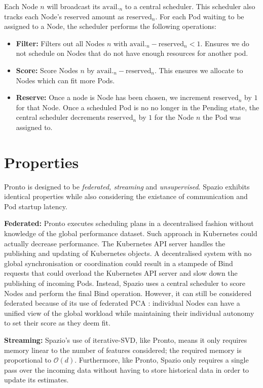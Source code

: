 Each Node $n$ will broadcast its $\text{avail.}_n$ to a central scheduler. This
scheduler also tracks each Node's reserved amount as $\text{reserved}_n$. For
each Pod waiting to be assigned to a Node, the scheduler performs the following
operations:
\begin{itemize}
    \item \textbf{Filter:} Filters out all Nodes $n$ with $\text{avail.}_n -
        \text{reserved}_n < 1$. Ensures we do not schedule on Nodes that do not
        have enough resources for another pod.
    \item \textbf{Score:} Score Nodes $n$ by $\text{avail.}_n -
        \text{reserved}_n$. This ensures we allocate to Nodes which can fit more
        Pods.
    \item \textbf{Reserve:} Once a node is Node has been chosen, we increment
        $\text{reserved}_n$ by $1$ for that Node. Once a scheduled Pod is no
        no longer in the Pending state, the central scheduler decrements
        $\text{reserved}_n$ by $1$ for the Node $n$ the Pod was assigned to.
\end{itemize}

\section{Properties}
Pronto is designed to be \textit{federated, streaming} and
\textit{unsupervised}. Spazio exhibits identical properties while also
considering the existance of communication and Pod startup latency.

\textbf{Federated:} Pronto executes scheduling plans in a decentralised fashion
without knowledge of the global performance dataset. Such approach in
Kubernetes could actually decrease performance. The Kubernetes API server
handles the publishing and updating of Kubernetes objects. A decentralised
system with no global synchronisation or coordination could result in a
stampede of Bind requests that could overload the Kubernetes API server and slow
down the publishing of incoming Pods. Instead, Spazio uses a central scheduler
to score Nodes and perform the final Bind operation. However, it can still be
considered federated because of its use of federated PCA \cite{}: individual
Nodes can have a unified view of the global workload while maintaining their
individual autonomy to set their score as they deem fit.

\textbf{Streaming:} Spazio's use of iterative-SVD, like Pronto, means it only
requires memory linear to the number of features considered; the required memory
is proportional to $\mathcal{O}(d)$. Furthermore, like Pronto, Spazio only
requires a single pass over the incoming data without having to store historical
data in order to update its estimates.

